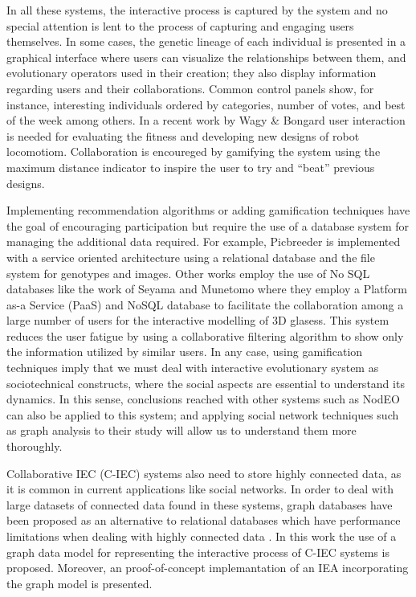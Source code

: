 \documentclass[conference]{IEEEtran}
\begin{document}
In all these systems, the interactive process is captured by the
system and no special attention is lent to the process of capturing
and engaging users themselves. In some cases, the genetic lineage of each
individual is presented in a graphical interface 
where users can visualize the relationships between them, and evolutionary operators used in
their creation; they also display information regarding users and
their collaborations.  Common control panels  show, for instance,  
interesting individuals ordered by categories, number of votes, and
best of the week among others. In a recent work by 
Wagy \& Bongard \cite{wagy2014collective} user interaction is needed for evaluating the fitness and developing
new designs of robot locomotiom. Collaboration is encoureged by gamifying the system 
using the maximum distance indicator to inspire the user to try and “beat” previous designs. 

Implementing recommendation algorithms or adding gamification techniques have the goal of encouraging participation 
but require the use of a database system for managing the additional data required. 
For example, Picbreeder \cite{picbreeder} is implemented with a service oriented
architecture using a relational database and the file system for genotypes and images. Other works employ the 
use of No SQL databases like the work of Seyama and Munetomo \cite{seyama2016development} where they
employ a Platform as-a Service (PaaS) and NoSQL database to facilitate the collaboration 
among a large number of users for the interactive modelling of 3D glasess.  This system reduces the user fatigue
by using a collaborative filtering algorithm to show only the
information utilized by similar users. In any case, using gamification
techniques imply that we must deal with interactive evolutionary
system as sociotechnical constructs, where the social aspects are
essential to understand its dynamics. In this sense, conclusions
reached with other systems such as NodEO
\cite{DBLP:conf/gecco/MereloCGCRV16} can also be applied to this
system; and applying social network techniques such as graph analysis
to their study will allow us to understand them more thoroughly. 

Collaborative IEC (C-IEC) systems also need to store highly connected data, as it is common in current applications
like social networks. In order to deal with large datasets of connected data found in these systems,
graph databases \cite{angles2012comparison} have been proposed as an alternative to relational databases 
which have performance limitations when dealing with highly connected data \cite{holzschuher2013performance}.
In this work the use of a graph data model for representing the interactive process of C-IEC systems is proposed.
Moreover, an proof-of-concept implemantation of an IEA incorporating the graph model is presented.
\end{document}
